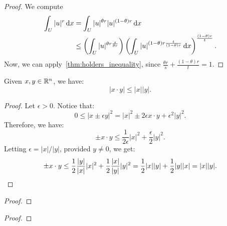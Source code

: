 \begin{proof}
  We compute
  \begin{align*}
    \int_U |u|^r \dx &= \int_U |u|^{\theta r} |u|^{(1-\theta)r} \dx \\
                      &\le \left(\int_U |u|^{\theta r \frac{s}{\theta r}}\right)\left(\int_U |u|^{(1-\theta)r \frac{t}{(1-\theta)r}}\dx\right)^{\frac{(1-\theta)r}{t}}
  .\end{align*}
  Now, we can apply~\cref{thm:holders_inequality}, since $\frac{\theta r}{s} + \frac{(1-\theta)r}{t} = 1$.
\end{proof}

\begin{theorem}
  \label{thm:cauchy_schwarz_inequality}

  Given $x, y \in \mathbb{R}^n$, we have:
  \begin{equation}\label{eq:cauchy_schwarz_inequality}
    |x \cdot y| \le |x| |y|
  .\end{equation}
\end{theorem}

\begin{proof}
  Let $\epsilon > 0$. Notice that:
  \[%
    0 \le |x \pm \epsilon y|^2 = |x|^2 \pm 2\epsilon x \cdot y + \epsilon^2|y|^2
  .\]%
  Therefore, we have:
  \[%
    \pm x \cdot y \le \frac{1}{2\epsilon}|x|^2 + \frac{\epsilon}{2}|y|^2
  .\]%
  Letting $\epsilon = |x|/|y|$, provided $y \ne 0$, we get:
  \[%
    \pm x \cdot y \le \frac{1}{2} \frac{|y|}{|x|} |x|^2 + \frac{1}{2} \frac{|x|}{|y|} |y|^2 = \frac{1}{2} |x||y| + \frac{1}{2} |y||x| = |x||y|
  .\qedhere\]%
\end{proof}

\begin{theorem}
  \label{thm:gronwall_inequality_differential_form}
\end{theorem}

\begin{proof}
\end{proof}

\begin{theorem}
  \label{thm:gronwall_inequality_integral_form}
\end{theorem}

\begin{proof}
\end{proof}

